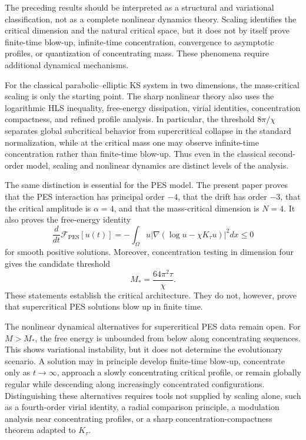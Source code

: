 \documentclass[pdflatex,sn-mathphys-num]{sn-jnl}%
\theoremstyle{thmstyleone}
\theoremstyle{thmstyletwo}
\theoremstyle{thmstylethree}
\begin{document}
The preceding results should be interpreted as a structural and variational
classification, not as a complete nonlinear dynamics theory.  Scaling identifies
the critical dimension and the natural critical space, but it does not by itself
prove finite-time blow-up, infinite-time concentration, convergence to
asymptotic profiles, or quantization of concentrating mass.  These phenomena
require additional dynamical mechanisms.

For the classical parabolic--elliptic KS system in two dimensions,
the mass-critical scaling is only the starting point.  The sharp nonlinear
theory also uses the logarithmic HLS inequality,
free-energy dissipation, virial identities, concentration compactness, and
refined profile analysis.  In particular, the threshold \(8\pi/\chi\) separates
global subcritical behavior from supercritical collapse in the standard
normalization, while at the critical mass one may observe infinite-time
concentration rather than finite-time blow-up. 
Thus even in the classical second-order model, scaling and nonlinear dynamics are distinct levels of the
analysis.

The same distinction is essential for the PES model.  The present paper proves
that the PES interaction has principal order \(-4\), that the drift has order
\(-3\), that the critical amplitude is \(\alpha=4\), and that the
mass-critical dimension is \(N=4\).  It also proves the free-energy identity
\[
        \frac{d}{dt}\mathcal F_{\mathrm{PES}}[u(t)]
        =
        -
        \int_\Omega
        u\left|\nabla(\log u-\chi K_\tau u)\right|^2dx
        \le0
\]
for smooth positive solutions.  Moreover, concentration testing in dimension
four gives the candidate threshold
\[
        M_*=\frac{64\pi^2\tau}{\chi}.
\]
These statements establish the critical architecture.  They do not,
however, prove that supercritical PES solutions blow up in finite time.

The nonlinear dynamical alternatives for supercritical PES data remain open.
For \(M>M_*\), the free energy is unbounded from below along concentrating
sequences.  This shows variational instability, but it does not determine the
evolutionary scenario.  A solution may in principle develop finite-time blow-up,
concentrate only as \(t\to\infty\), approach a slowly concentrating critical
profile, or remain globally regular while descending along increasingly
concentrated configurations.  Distinguishing these alternatives requires tools
not supplied by scaling alone, such as a fourth-order virial identity, a radial
comparison principle, a modulation analysis near concentrating profiles, or a
sharp concentration-compactness theorem adapted to \(K_\tau\).
\end{document}
